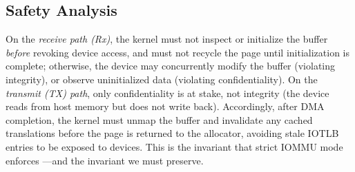 \subsection{Safety Analysis}
\label{sec:security}


On the {\it receive path (Rx)},
    the kernel must not inspect or initialize the buffer {\it before} revoking device access, 
    and must not recycle the page until initialization is complete;
otherwise, the device may concurrently modify the buffer (violating integrity), 
or observe uninitialized data (violating confidentiality).
On the {\it transmit (TX) path}, only confidentiality is at stake, not integrity
    (the device reads from host memory but does not write back). 
Accordingly, after DMA completion, the kernel must unmap the buffer
    and invalidate any cached translations before the page is returned to the allocator,
    avoiding stale IOTLB entries to be exposed to devices.
This is the invariant that strict IOMMU mode enforces ---and the invariant we must preserve.
\fi 

